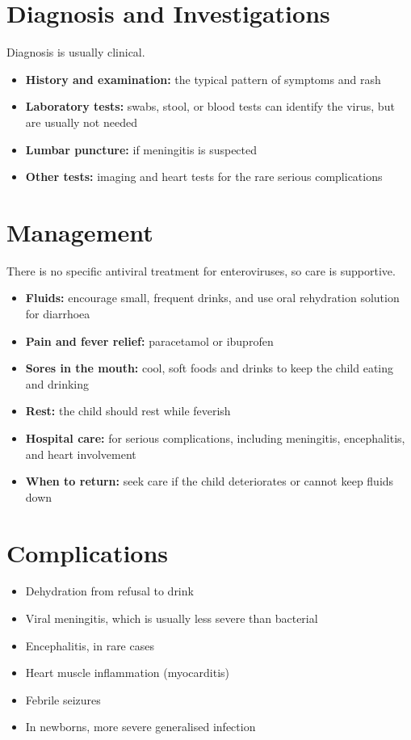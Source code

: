 \section*{Diagnosis and Investigations}
Diagnosis is usually clinical.
\begin{itemize}
    \item \textbf{History and examination:} the typical pattern of symptoms and rash
    \item \textbf{Laboratory tests:} swabs, stool, or blood tests can identify the virus, but are usually not needed
    \item \textbf{Lumbar puncture:} if meningitis is suspected
    \item \textbf{Other tests:} imaging and heart tests for the rare serious complications
\end{itemize}

\section*{Management}
There is no specific antiviral treatment for enteroviruses, so care is supportive.
\begin{itemize}
    \item \textbf{Fluids:} encourage small, frequent drinks, and use oral rehydration solution for diarrhoea
    \item \textbf{Pain and fever relief:} paracetamol or ibuprofen
    \item \textbf{Sores in the mouth:} cool, soft foods and drinks to keep the child eating and drinking
    \item \textbf{Rest:} the child should rest while feverish
    \item \textbf{Hospital care:} for serious complications, including meningitis, encephalitis, and heart involvement
    \item \textbf{When to return:} seek care if the child deteriorates or cannot keep fluids down
\end{itemize}

\section*{Complications}
\begin{itemize}
    \item Dehydration from refusal to drink
    \item Viral meningitis, which is usually less severe than bacterial
    \item Encephalitis, in rare cases
    \item Heart muscle inflammation (myocarditis)
    \item Febrile seizures
    \item In newborns, more severe generalised infection
\end{itemize}

